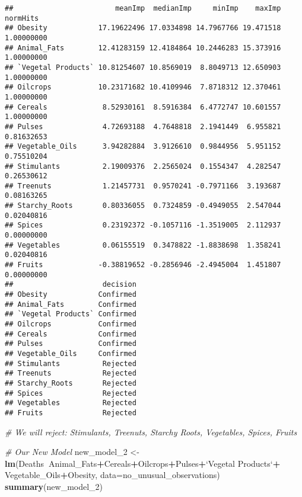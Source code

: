 \documentclass[
]{article}
\newenvironment{Shaded}{\begin{snugshade}}{\end{snugshade}}
\newcommand{\CommentTok}[1]{\textcolor[rgb]{0.56,0.35,0.01}{\textit{#1}}}
\newcommand{\DataTypeTok}[1]{\textcolor[rgb]{0.13,0.29,0.53}{#1}}
\newcommand{\DecValTok}[1]{\textcolor[rgb]{0.00,0.00,0.81}{#1}}
\newcommand{\KeywordTok}[1]{\textcolor[rgb]{0.13,0.29,0.53}{\textbf{#1}}}
\newcommand{\NormalTok}[1]{#1}
\newcommand{\OperatorTok}[1]{\textcolor[rgb]{0.81,0.36,0.00}{\textbf{#1}}}
\newcommand{\StringTok}[1]{\textcolor[rgb]{0.31,0.60,0.02}{#1}}
\begin{document}
\begin{verbatim}
##                        meanImp  medianImp     minImp    maxImp   normHits
## Obesity            17.19622496 17.0334898 14.7967766 19.471518 1.00000000
## Animal_Fats        12.41283159 12.4184864 10.2446283 15.373916 1.00000000
## `Vegetal Products` 10.81254607 10.8569019  8.8049713 12.650903 1.00000000
## Oilcrops           10.23171682 10.4109946  7.8718312 12.370461 1.00000000
## Cereals             8.52930161  8.5916384  6.4772747 10.601557 1.00000000
## Pulses              4.72693188  4.7648818  2.1941449  6.955821 0.81632653
## Vegetable_Oils      3.94282884  3.9126610  0.9844956  5.951152 0.75510204
## Stimulants          2.19009376  2.2565024  0.1554347  4.282547 0.26530612
## Treenuts            1.21457731  0.9570241 -0.7971166  3.193687 0.08163265
## Starchy_Roots       0.80336055  0.7324859 -0.4949055  2.547044 0.02040816
## Spices              0.23192372 -0.1057116 -1.3519005  2.112937 0.00000000
## Vegetables          0.06155519  0.3478822 -1.8838698  1.358241 0.02040816
## Fruits             -0.38819652 -0.2856946 -2.4945004  1.451807 0.00000000
##                     decision
## Obesity            Confirmed
## Animal_Fats        Confirmed
## `Vegetal Products` Confirmed
## Oilcrops           Confirmed
## Cereals            Confirmed
## Pulses             Confirmed
## Vegetable_Oils     Confirmed
## Stimulants          Rejected
## Treenuts            Rejected
## Starchy_Roots       Rejected
## Spices              Rejected
## Vegetables          Rejected
## Fruits              Rejected
\end{verbatim}

\begin{Shaded}
\begin{Highlighting}[]
\CommentTok{# We will reject: Stimulants, Treenuts, Starchy Roots, Vegetables, Spices, Fruits}

\CommentTok{# Our New Model }
\NormalTok{new_model_}\DecValTok{2}\NormalTok{ <-}\StringTok{ }\KeywordTok{lm}\NormalTok{(Deaths}\OperatorTok{~}\NormalTok{Animal_Fats}\OperatorTok{+}\NormalTok{Cereals}\OperatorTok{+}\NormalTok{Oilcrops}\OperatorTok{+}\NormalTok{Pulses}\OperatorTok{+}\StringTok{`}\DataTypeTok{Vegetal Products}\StringTok{`}\OperatorTok{+}
\StringTok{                    }\NormalTok{Vegetable_Oils}\OperatorTok{+}\NormalTok{Obesity, }\DataTypeTok{data=}\NormalTok{no_unusual_observations)}
\KeywordTok{summary}\NormalTok{(new_model_}\DecValTok{2}\NormalTok{)}
\end{Highlighting}
\end{Shaded}
\end{document}
